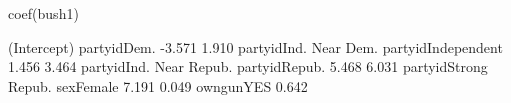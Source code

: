 \begin{Schunk}
\begin{Sinput}
 coef(bush1)
\end{Sinput}
\begin{Soutput}
            (Intercept)             partyidDem. 
                 -3.571                   1.910 
  partyidInd. Near Dem.      partyidIndependent 
                  1.456                   3.464 
partyidInd. Near Repub.           partyidRepub. 
                  5.468                   6.031 
   partyidStrong Repub.               sexFemale 
                  7.191                   0.049 
              owngunYES 
                  0.642 
\end{Soutput}
\end{Schunk}
